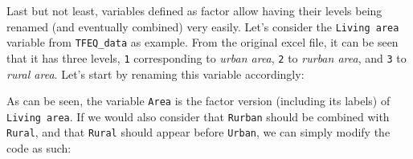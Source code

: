 \documentclass[
]{book}
\newenvironment{Shaded}{\begin{snugshade}}{\end{snugshade}}
\newcommand{\AttributeTok}[1]{\textcolor[rgb]{0.77,0.63,0.00}{#1}}
\newcommand{\DecValTok}[1]{\textcolor[rgb]{0.00,0.00,0.81}{#1}}
\newcommand{\FunctionTok}[1]{\textcolor[rgb]{0.00,0.00,0.00}{#1}}
\newcommand{\NormalTok}[1]{#1}
\newcommand{\OtherTok}[1]{\textcolor[rgb]{0.56,0.35,0.01}{#1}}
\newcommand{\SpecialCharTok}[1]{\textcolor[rgb]{0.00,0.00,0.00}{#1}}
\newcommand{\StringTok}[1]{\textcolor[rgb]{0.31,0.60,0.02}{#1}}
\begin{document}
Last but not least, variables defined as factor allow having their levels being renamed (and eventually combined) very easily.
Let's consider the \texttt{Living\ area} variable from \texttt{TFEQ\_data} as example. From the original excel file, it can be seen that it has three levels, \texttt{1} corresponding to \emph{urban area}, \texttt{2} to \emph{rurban area}, and \texttt{3} to \emph{rural area}.
Let's start by renaming this variable accordingly:

\begin{Shaded}
\end{Shaded}

As can be seen, the variable \texttt{Area} is the factor version (including its labels) of \texttt{Living\ area}.
If we would also consider that \texttt{Rurban} should be combined with \texttt{Rural}, and that \texttt{Rural} should appear before \texttt{Urban}, we can simply modify the code as such:

\begin{Shaded}
\end{Shaded}
\end{document}
